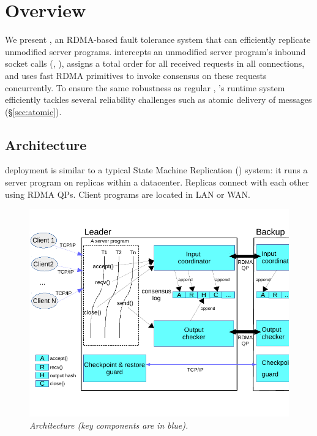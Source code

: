 \section{Overview} \label{sec:overview}

We present \xxx, an RDMA-based fault tolerance system that can efficiently 
replicate unmodified server programs. \xxx intercepts an unmodified server 
program's inbound socket calls (\eg, \recv), assigns a total order for all 
received requests in all connections, and uses fast RDMA primitives to invoke 
consensus on these requests concurrently. To ensure the same robustness as 
regular \paxos, \xxx's runtime system efficiently tackles several reliability 
challenges such as atomic delivery of messages (\S\ref{sec:atomic}).

\subsection{Architecture} \label{sec:arch}

\xxx deployment is similar to a typical State Machine Replication (\smr) 
system: it runs a server program on replicas within a datacenter. Replicas 
connect with each other using RDMA QPs. Client programs are located in LAN or 
WAN.

\begin{figure}[ht]
\begin{center}
\includegraphics{figures/arch}
\caption{\em \xxx Architecture (key components are in
  blue).}\label{fig:arch}
\end{center}
\end{figure}

